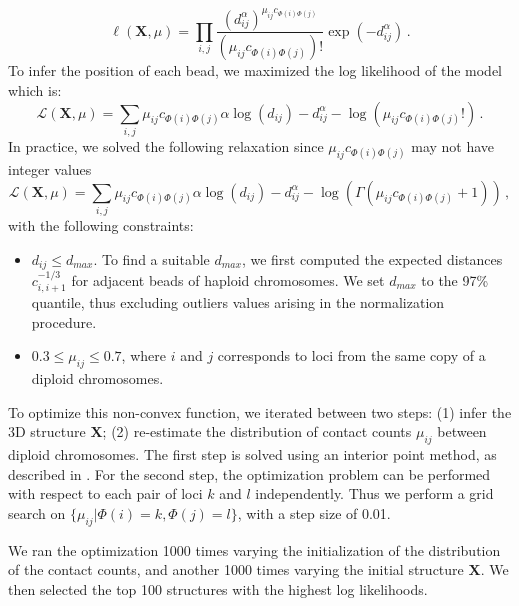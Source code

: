 \begin{equation}
\ell(\mathbf{X}, \mu) = \prod_{i, j} \frac{(d_{ij}^{\alpha})^{\mu_{ij}
c_{\Phi(i)\Phi(j)}}}
					   {(\mu_{ij} c_{\Phi(i)\Phi(j)})!}
		         \exp (- d_{ij}^{\alpha}) \,.
\end{equation}
To infer the position of each bead, we maximized the log likelihood of the
model which is:
\begin{equation}
\mathcal{L}(\mathbf{X}, \mu) = \sum_{i, j} \mu_{ij} c_{\Phi(i)\Phi(j)} \alpha \log(d_{ij})
- d_{ij}^{\alpha} - \log(\mu_{ij} c_{\Phi(i)\Phi(j)}!) \,.
\end{equation}
In practice, we solved the following relaxation since $\mu_{ij}c_{\Phi(i)\Phi(j)}$ may not
have integer values
\begin{equation}
\mathcal{L}(\mathbf{X}, \mu) = \sum_{i, j} \mu_{ij} c_{\Phi(i)\Phi(j)} \alpha \log(d_{ij})
- d_{ij}^{\alpha} - \log( \Gamma(\mu_{ij} c_{\Phi(i)\Phi(j)} + 1)) \,,
\end{equation}
with the following constraints:
\begin{itemize}
\item $d_{ij} \leq d_{max}$. To find a suitable $d_{max}$, we first computed
the expected distances $c_{i, i+1} ^{-1 / 3}$ for adjacent beads of haploid
chromosomes. We set $d_{max}$ to the 97\% quantile, thus excluding outliers
values arising in the normalization procedure.
\item $0.3 \leq \mu_{ij} \leq 0.7$, where $i$ and $j$ corresponds to loci from
the same copy of a diploid chromosomes.
\end{itemize}

To optimize this non-convex function, we iterated between two steps: (1) infer
the 3D structure $\mathbf{X}$; (2) re-estimate the distribution of contact counts $\mu_{ij}$ between
diploid chromosomes. The first step is solved using an interior point method,
as described in \citet{varoquaux:statistical}.
For the second step, the optimization problem can be performed with respect to
each pair of loci $k$ and $l$ independently. Thus we perform a grid search
on $\{\mu_{ij} | \Phi(i) = k, \Phi(j) = l\}$, with a step size of 0.01.

We ran the
optimization 1000 times varying the initialization of the distribution of the
contact counts, and another 1000 times varying the initial structure
$\textbf{X}$. We then selected the top 100 structures with the highest log
likelihoods.

\bigskip %

